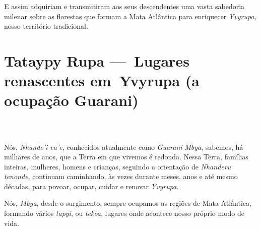 E assim adquiriam e transmitiram aos seus descendentes uma vasta
sabedoria milenar sobre as florestas que formam a Mata Atlântica para
enriquecer \emph{Yvyrupa}, nosso território tradicional.




 

\part[Lugares renascentes em Yvyrupa]{Tataypy Rupa — Lugares renascentes em Yvyrupa (a ocupação Guarani)}
\chapter*{}  

Nós, \emph{Nhande'i va'e}, conhecidos atualmente como \emph{Guarani}
\emph{Mbya}, sabemos, há milhares de anos, que a Terra em que vivemos é
redonda. Nessa Terra, famílias inteiras, mulheres, homens e crianças,
seguindo a orientação de \emph{Nhanderu tenonde}, continuam caminhando,
às vezes durante meses, anos e até mesmo décadas, para povoar, ocupar,
cuidar e renovar \emph{Yvyrupa}.

Nós, \emph{Mbya}, desde o surgimento, sempre ocupamos as regiões de Mata
Atlântica, formando vários \emph{tapyi}, ou \emph{tekoa}, lugares onde
acontece nosso próprio modo de vida.

 
